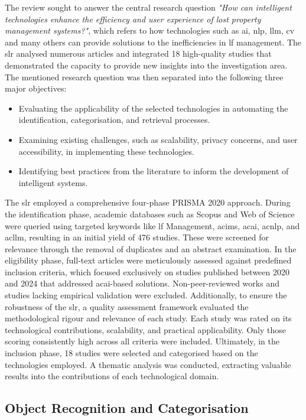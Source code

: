 The review sought to answer the central research question \textit{"How can intelligent technologies enhance the efficiency and user experience of lost property management systems?"}, which refers to how technologies such as \ac{ai}, \ac{nlp}, \ac{llm}, \ac{cv} and many others can provide solutions to the inefficiencies in \ac{lf} management. The \ac{slr} analysed numerous articles and integrated 18 high-quality studies that demonstrated the capacity to provide new insights into the investigation area. The mentioned research question was then separated into the following three major objectives:

\begin{itemize}
    \item Evaluating the applicability of the selected technologies in automating the identification, categorisation, and retrieval processes.
    \item Examining existing challenges, such as scalability, privacy concerns, and user accessibility, in implementing these technologies.
    \item Identifying best practices from the literature to inform the development of intelligent systems.
\end{itemize}

The \ac{slr} employed a comprehensive four-phase PRISMA 2020 approach. During the identification phase, academic databases such as Scopus and Web of Science were queried using targeted keywords like \ac{lf} Management, ac{ims}, ac{ai}, ac{nlp}, and ac{llm}, resulting in an initial yield of 476 studies. These were screened for relevance through the removal of duplicates and an abstract examination. In the eligibility phase, full-text articles were meticulously assessed against predefined inclusion criteria, which focused exclusively on studies published between 2020 and 2024 that addressed ac{ai}-based solutions. Non-peer-reviewed works and studies lacking empirical validation were excluded. Additionally, to ensure the robustness of the \ac{slr}, a quality assessment framework evaluated the methodological rigour and relevance of each study. Each study was rated on its technological contributions, scalability, and practical applicability. Only those scoring consistently high across all criteria were included. Ultimately, in the inclusion phase, 18 studies were selected and categorised based on the technologies employed. A thematic analysis was conducted, extracting valuable results into the contributions of each technological domain.

\subsection{Object Recognition and Categorisation} \label{subsec:object-recognition}

